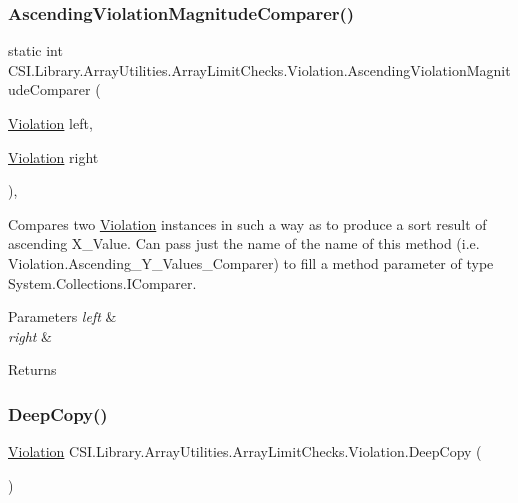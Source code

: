 \subsubsection{\texorpdfstring{AscendingViolationMagnitudeComparer()}{AscendingViolationMagnitudeComparer()}}
{\footnotesize\ttfamily static int C\+S\+I.\+Library.\+Array\+Utilities.\+Array\+Limit\+Checks.\+Violation.\+Ascending\+Violation\+Magnitude\+Comparer (\begin{DoxyParamCaption}\item[{\mbox{\hyperlink{class_c_s_i_1_1_library_1_1_array_utilities_1_1_array_limit_checks_1_1_violation}{Violation}}}]{left,  }\item[{\mbox{\hyperlink{class_c_s_i_1_1_library_1_1_array_utilities_1_1_array_limit_checks_1_1_violation}{Violation}}}]{right }\end{DoxyParamCaption})\hspace{0.3cm}{\ttfamily [inline]}, {\ttfamily [static]}}



Compares two \mbox{\hyperlink{class_c_s_i_1_1_library_1_1_array_utilities_1_1_array_limit_checks_1_1_violation}{Violation}} instances in such a way as to produce a sort result of ascending X\+\_\+\+Value. Can pass just the name of the name of this method (i.\+e. Violation.\+Ascending\+\_\+\+Y\+\_\+\+Values\+\_\+\+Comparer) to fill a method parameter of type System.\+Collections.\+I\+Comparer. 


\begin{DoxyParams}{Parameters}
{\em left} & \\
\hline
{\em right} & \\
\hline
\end{DoxyParams}
\begin{DoxyReturn}{Returns}

\end{DoxyReturn}
\mbox{\label{class_c_s_i_1_1_library_1_1_array_utilities_1_1_array_limit_checks_1_1_violation_ac05d3e5edc82aed8e5c4da8e5caf9897}} 
\subsubsection{\texorpdfstring{DeepCopy()}{DeepCopy()}}
{\footnotesize\ttfamily \mbox{\hyperlink{class_c_s_i_1_1_library_1_1_array_utilities_1_1_array_limit_checks_1_1_violation}{Violation}} C\+S\+I.\+Library.\+Array\+Utilities.\+Array\+Limit\+Checks.\+Violation.\+Deep\+Copy (\begin{DoxyParamCaption}{ }\end{DoxyParamCaption})\hspace{0.3cm}{\ttfamily [inline]}}



